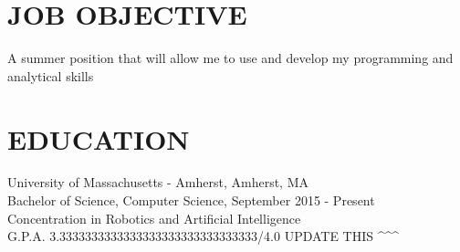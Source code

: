\documentclass{res}
\begin{document}
 

\address{\bf  PRESENT ADDRESS\\145 Commonwealth Avenue\\Amherst, MA 01003-9253\\(908) 902-2202}
\address{\bf PERMANENT ADDRESS \\ 117 Agress Road \\  Millstone, NJ 08510 \\  (908) 902-2202}
\begin{resume}
\section{JOB OBJECTIVE}          
    A summer position that will allow me to use and develop my programming and analytical skills       
    \vspace{-0.2in}   
\section{EDUCATION}          
    University of Massachusetts - Amherst, Amherst, MA  \\        
    Bachelor of Science, Computer Science, September 2015 - Present   \\       
    Concentration in Robotics and Artificial Intelligence       \\
    G.P.A. 3.3333333333333333333333333333333/4.0          UPDATE THIS  \textasciicircum \textasciicircum \textasciicircum
    \vspace{-0.2in}

\end{resume}
\end{document}
